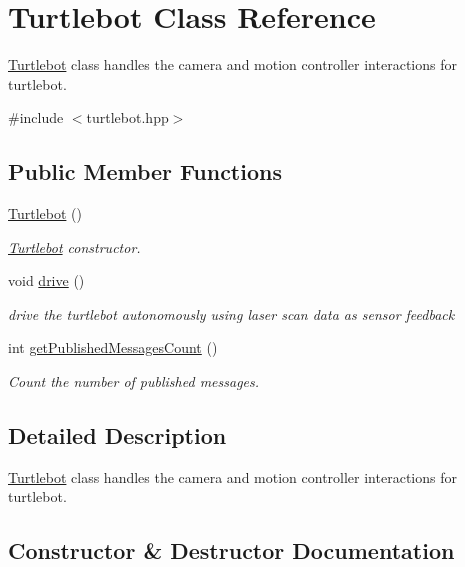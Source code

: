 \hypertarget{class_turtlebot}{}\section{Turtlebot Class Reference}
\label{class_turtlebot}


\hyperlink{class_turtlebot}{Turtlebot} class handles the camera and motion controller interactions for turtlebot.  




{\ttfamily \#include $<$turtlebot.\+hpp$>$}

\subsection*{Public Member Functions}
\begin{DoxyCompactItemize}
\item 
\hyperlink{class_turtlebot_a683061fc512bfb8d2a35134e783767ff}{Turtlebot} ()
\begin{DoxyCompactList}\small\item\em \hyperlink{class_turtlebot}{Turtlebot} constructor. \end{DoxyCompactList}\item 
void \hyperlink{class_turtlebot_a5dbaec0d4b316a65062a036dc5737545}{drive} ()
\begin{DoxyCompactList}\small\item\em drive the turtlebot autonomously using laser scan data as sensor feedback \end{DoxyCompactList}\item 
int \hyperlink{class_turtlebot_a03f1941b9f094babca17420ce8f5f25e}{get\+Published\+Messages\+Count} ()
\begin{DoxyCompactList}\small\item\em Count the number of published messages. \end{DoxyCompactList}\end{DoxyCompactItemize}


\subsection{Detailed Description}
\hyperlink{class_turtlebot}{Turtlebot} class handles the camera and motion controller interactions for turtlebot. 

\subsection{Constructor \& Destructor Documentation}
